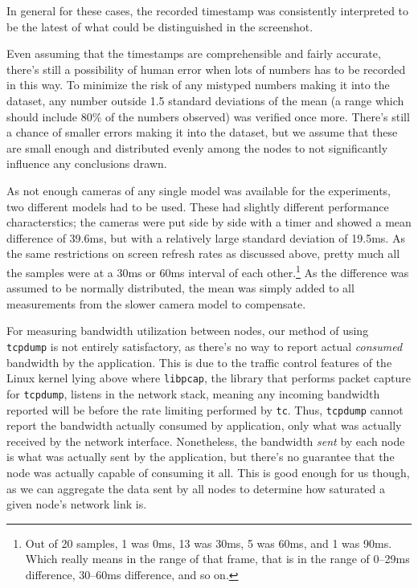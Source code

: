 In general for these cases, the recorded timestamp was consistently interpreted to be the latest of what could be distinguished in the screenshot.

Even assuming that the timestamps are comprehensible and fairly accurate, there's still a possibility of human error when lots of numbers has to be recorded in this way. To minimize the risk of any mistyped numbers making it into the dataset, any number outside 1.5 standard deviations of the mean (a range which should include 80\% of the numbers observed) was verified once more. There's still a chance of smaller errors making it into the dataset, but we assume that these are small enough and distributed evenly among the nodes to not significantly influence any conclusions drawn.

As not enough cameras of any single model was available for the experiments, two different models had to be used. These had slightly different performance characterstics; the cameras were put side by side with a timer and showed a mean difference of 39.6ms, but with a relatively large standard deviation of 19.5ms. As the same restrictions on screen refresh rates as discussed above, pretty much all the samples were at a 30ms or 60ms interval of each other.\footnote{Out of 20 samples, 1 was 0ms, 13 was 30ms, 5 was 60ms, and 1 was 90ms. Which really means in the range of that frame, that is in the range of 0--29ms difference, 30--60ms difference, and so on.} As the difference was assumed to be normally distributed, the mean was simply added to all measurements from the slower camera model to compensate.

For measuring bandwidth utilization between nodes, our method of using \texttt{tcpdump} is not entirely satisfactory, as there's no way to report actual \emph{consumed} bandwidth by the application. This is due to the traffic control features of the Linux kernel lying above where \texttt{libpcap}, the library that performs packet capture for \texttt{tcpdump}, listens in the network stack, meaning any incoming bandwidth reported will be before the rate limiting performed by \texttt{tc}. Thus, \texttt{tcpdump} cannot report the bandwidth actually consumed by application, only what was actually received by the network interface. Nonetheless, the bandwidth \emph{sent} by each node is what was actually sent by the application, but there's no guarantee that the node was actually capable of consuming it all. This is good enough for us though, as we can aggregate the data sent by all nodes to determine how saturated a given node's network link is.

